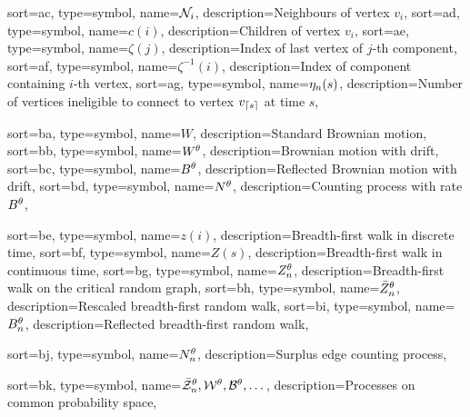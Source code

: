 {
	sort={ac},
	type=symbol,
	name={$\mathcal{N}_{i}$},
	description={Neighbours of vertex $v_i$, \pageref{D: Ni}}
}
{
	sort={ad},
	type=symbol,
	name={$c(i)$},
	description={Children of vertex $v_i$, \pageref{D: ci}}
}
{
	sort={ae},
	type=symbol,
	name={$\zeta(j)$},
	description={Index of last vertex of $j$-th component, \pageref{E: zeta}}
}
{
	sort={af},
	type=symbol,
	name={$\zeta^{-1}(i)$},
	description={Index of component containing $i$-th vertex, \pageref{E: zeta}}
}
{
	sort={ag},
	type=symbol,
	name={$\eta_n(s)$},
	description={Number of vertices ineligible to connect to vertex $v_{\lceil s\rceil}$ at time $s$, \pageref{I: eta}}
}



{
	sort={ba},
	type=symbol,
	name={$W$},
	description={Standard Brownian motion, \pageref{I: bm}}
}
{
	sort={bb},
	type=symbol,
	name={$W^{\theta}$},
	description={Brownian motion with drift, \pageref{D: Wt}}
}
{
	sort={bc},
	type=symbol,
	name={$B^{\theta}$},
	description={Reflected Brownian motion with drift, \pageref{D: Bt}}
}
{
	sort={bd},
	type=symbol,
name={$N^{\theta}$},
description={Counting process with rate $B^{\theta}$, \pageref{I: nt}}
}

{
	sort={be},
	type=symbol,
	name={$z(i)$},
	description={Breadth-first walk in discrete time, \pageref{E: def bf-walk z}}
}
{
	sort={bf},
	type=symbol,
	name={$Z(s)$},
	description={Breadth-first walk in continuous time, \pageref{E: def Z}}
}
{
	sort={bg},
	type=symbol,
	name={$Z_n^{\theta}$},
	description={Breadth-first walk on the critical random graph, \pageref{D: znt}}
}
{
	sort={bh},
	type=symbol,
	name={$\bar{Z}^{\theta}_n$},
	description={Rescaled breadth-first random walk, \pageref{T: Z -> W}}
}
{
	sort={bi},
	type=symbol,
	name={$B_n^{\theta}$},
	description={Reflected breadth-first random walk, \pageref{D: zminz}}
}

{
	sort={bj},
	type=symbol,
name={$N_n^{\theta}$},
description={Surplus edge counting process, \pageref{I: nnt}}
}

{
	sort={bk},
	type=symbol,
name={$\bar{\mathcal{Z}}^{\theta}_n, \mathcal{W}^{\theta}, \mathcal{B}^{\theta}, \dots$},
description={Processes on common probability space, \pageref{T: Skorohod}}
}

